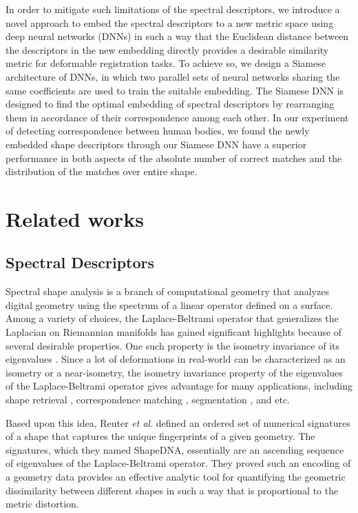 \documentclass[5p,twocolumn,10pt,times]{elsarticle}
\begin{document}
In order to mitigate such limitations of the spectral descriptors, we introduce a novel approach to embed the spectral descriptors to a new metric space using deep neural networks (DNNs) in such a way that the Euclidean distance between the descriptors in the new embedding directly provides a desirable similarity metric for deformable registration tasks. To achieve so, we design a Siamese architecture of DNNs, in which two parallel sets of neural networks sharing the same coefficients are used to train the suitable embedding. The Siamese DNN is designed to find the optimal embedding of spectral descriptors by rearranging them in accordance of their correspondence among each other. In our experiment of detecting correspondence between human bodies, we found the newly embedded shape descriptors through our Siamese DNN have a superior performance in both aspects of the absolute number of correct matches and the distribution of the matches over entire shape.
\section{Related works}
\subsection{Spectral Descriptors}

Spectral shape analysis is a branch of computational geometry that analyzes digital geometry using the spectrum of a linear operator defined on a surface. Among a variety of choices, the Laplace-Beltrami operator \cite{rosenberg1997} that generalizes the Laplacian on Riemannian manifolds has gained significant highlights because of several desirable properties. One such property is the isometry invariance of its eigenvalues \cite{levy2006}. Since a lot of deformations in real-world can be characterized as an isometry or a near-isometry, the isometry invariance property of the eigenvalues of the Laplace-Beltrami operator gives advantage for many applications, including shape retrieval \cite{reuter2005laplace,jain2007spectral,li2014spatially,bronstein2010scale}, correspondence matching \cite{dubrovina2010matching,ovsjanikov2010one}, segmentation \cite{reuter2009discrete,aubry2011pose}, and etc.

Based upon this idea, Reuter \textit{et al}. \cite{Reuter2006} defined an ordered set of numerical signatures of a shape that captures the unique fingerprints of a given geometry. The signatures, which they named ShapeDNA, essentially are an ascending sequence of eigenvalues of the Laplace-Beltrami operator. They proved such an encoding of a geometry data provides an effective analytic tool for quantifying the geometric dissimilarity between different shapes in such a way that is proportional to the metric distortion.
\end{document}
